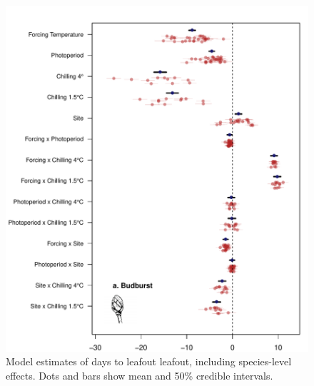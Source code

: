 \documentclass{article}
\begin{document}
\begin{figure}
\label{figS3}
\includegraphics[width=1\textwidth, page=2]{Fig1_bb_lo+sp}
\caption{Model estimates of days to leafout leafout, including species-level effects. Dots and bars show mean and 50\% credible intervals.}
\end{figure}
\end{document}
